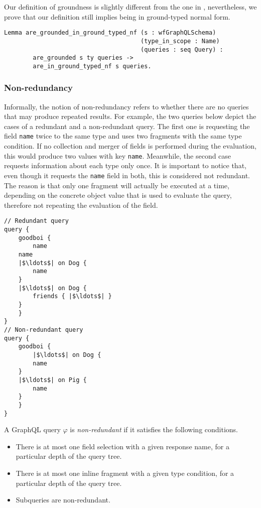 Our definition of groundness is slightly different from the one in \HP{}, nevertheless, we prove that our definition still implies being in ground-typed normal form.

\begin{verbatim}
Lemma are_grounded_in_ground_typed_nf (s : wfGraphQLSchema)
                                      (type_in_scope : Name)
                                      (queries : seq Query) :
        are_grounded s ty queries ->
        are_in_ground_typed_nf s queries.
\end{verbatim}

\subsubsection*{Non-redundancy}

Informally, the notion of non-redundancy refers to whether there are no queries that may produce repeated results. For example, the two queries below depict the cases of a redundant and a non-redundant query. The first one is requesting the field \texttt{name} twice to the same type and uses two fragments with the same type condition. If no collection and merger of fields is performed during the evaluation, this would produce two values with key \texttt{name}. Meanwhile, the second case requests information about each type only once. It is important to notice that, even though it requests the \texttt{name} field in both,  this is considered not redundant. The reason is that only one fragment will actually be executed at a time, depending on the concrete object value that is used to evaluate the query, therefore not repeating the evaluation of the field.

\begin{verbatim}
// Redundant query
query {
    goodboi {
        name
	name
	|$\ldots$| on Dog {
	    name
	}
	|$\ldots$| on Dog {
	    friends { |$\ldots$| }
	}
    }
}
// Non-redundant query
query {
    goodboi {
        |$\ldots$| on Dog {
	    name
	}
	|$\ldots$| on Pig {
	    name
	}
    }	
}
\end{verbatim} 

\begin{definition}
A GraphQL query $\varphi$ is \textit{non-redundant} if it satisfies the following conditions.
\begin{itemize}
    \item There is at most one field selection with a given response name, for a particular depth of the query tree.

    \item There is at most one inline fragment with a given type condition, for a particular depth of the query tree.
    
    \item Subqueries are non-redundant.
\end{itemize}
\end{definition}


